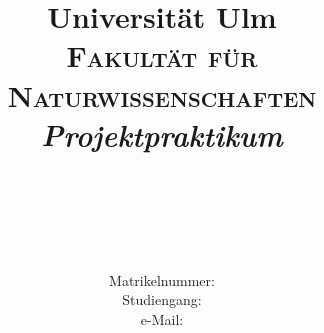 \title{Universit\"{a}t Ulm\\\vspace{1cm}
{\LARGE \textnormal{\textsc{Fakult\"{a}t f\"{u}r Naturwissenschaften}}}\\\vspace{2cm} {\LARGE \textnormal{\textsl{Projektpraktikum \Semester}}}\\\vspace{3cm} \zubearbeiten{\textit{\Projekt}}\\
{\Large \zubearbeiten{\textit{\Schwerpunkt}}}}

\author{{\LARGE \zubearbeiten{\IhrName}}\\ $_{}$\\$_{}$\\\vspace*{1.cm}
Matrikelnummer:  \zubearbeiten{\Matrikelnummer}\\\vspace{0.8cm} Studiengang: \zubearbeiten{\Studiengang}\\\vspace{1cm} e-Mail: \zubearbeiten{\emailAdresse}}

\date{\zubearbeiten{\dasDatum}}

\maketitle
